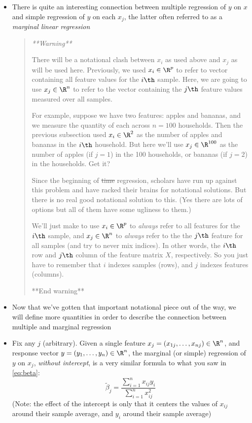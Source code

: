 \documentclass{article}
\begin{document}
\begin{itemize}
\item There is quite an interesting connection between multiple regression of
  $y$ on $x$ and simple regression of $y$ on each $x_j$, the latter often
  referred to as a \emph{marginal linear regression}

\begin{quote}\it
**Warning** 

There will be a notational clash between $x_i$ as used above and $x_j$ as will
be used here. Previously, we used $x_i \in \R^p$ to refer to vector containing
all feature values for the $i\th$ sample. Here, we are going to use $x_j \in
\R^n$ to refer to the vector containing the $j\th$ feature values measured over
all samples.       

For example, suppose we have two features: apples and bananas, and we measure
the quantity of each across $n = 100$ households. Then the previous subsection
used $x_i \in \R^2$ as the number of apples and bananas in the $i\th$
household. But here we'll use $x_j \in \R^{100}$ as the number of apples (if
$j=1$) in the 100 households, or bananas (if $j=2$) in the households. Get it? 

Since the beginning of \sout{time} regression, scholars have run up against this
problem and have racked their brains for notational solutions. But there is no
real good notational solution to this. (Yes there are lots of options but all of
them have some ugliness to them.)

We'll just make to use $x_i \in \R^p$ to \emph{always} refer to all features for
the $i\th$ sample, and $x_j \in \R^n$ to \emph{always} refer to the the $j\th$
feature for all samples (and try to never mix indices). In other words, the
$i\th$ row and $j\th$ column of the feature matrix $X$, respectively. So you
just have to remember that $i$ indexes samples (rows), and $j$ indexes features
(columns). 

**End warning** 
\end{quote}

\item Now that we've gotten that important notational piece out of the way, we
  will define more quantities in order to describe the connection between
  multiple and marginal regression

\item Fix any $j$ (arbitrary). Given a single feature $x_j = (x_{1j}, \dots,
  x_{nj}) \in \R^n$, and response vector $y = (y_1, \dots, y_n) \in \R^n$, the 
  marginal (or simple) regression of $y$ on $x_j$, \emph{without intercept}, is
  a very similar formula to what you saw in \eqref{eq:beta}:
  \[
  \tilde\beta_j = \frac{\sum_{i=1}^n x_{ij} y_i}{\sum_{i=1}^n x_{ij}^2} 
  \]
  (Note: the effect of the intercept is only that it centers the values of
  $x_{ij}$ around their sample average, and $y_i$ around their sample average)     


\end{itemize}
\end{document}
